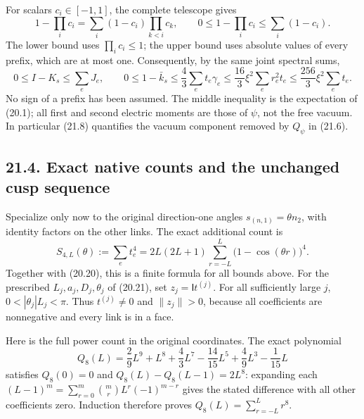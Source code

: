 \documentclass[
]{article}
\begin{document}
For scalars \(c_i\in[-1,1]\), the complete telescope gives \[
1-\prod_i c_i=\sum_i(1-c_i)\prod_{k<i}c_k,\qquad
0\le1-\prod_i c_i\le\sum_i(1-c_i).
\] The lower bound uses \(\prod_i c_i\le1\); the upper bound uses
absolute values of every prefix, which are at most one. Consequently, by
the same joint spectral sums, \[
0\le I-K_s\le\sum_e J_e,\qquad
0\le1-\bar k_s
 \le\frac43\sum_e t_e\gamma_e
 \le\frac{16}{3}\xi^2\sum_e r_e^2t_e
 \le\frac{256}{3}\xi^2\sum_e t_e .                             \tag{21.8}
\] No sign of a prefix has been assumed. The middle inequality is the
expectation of (20.1); all first and second electric moments are those
of \(\psi\), not the free vacuum. In particular (21.8) quantifies the
vacuum component removed by \(Q_\psi\) in (21.6).

\subsection{21.4. Exact native counts and the unchanged cusp
sequence}\label{exact-native-counts-and-the-unchanged-cusp-sequence}

Specialize only now to the original direction-one angles
\(s_{(n,1)}=\theta n_2\), with identity factors on the other links. The
exact additional count is \[
S_{4,L}(\theta):=\sum_e t_e^4
 =2L(2L+1)\sum_{r=-L}^{L}\bigl(1-\cos(\theta r)\bigr)^4 .
                                                               \tag{21.9}
\] Together with (20.20), this is a finite formula for all bounds above.
For the prescribed \(L_j,a_j,D_j,\theta_j\) of (20.21), set
\(z_j=\mathsf I t^{(j)}\). For all sufficiently large \(j\),
\(0<|\theta_j|L_j<\pi\). Thus \(t^{(j)}\ne0\) and \(\|z_j\|>0\), because
all coefficients are nonnegative and every link is in a face.

Here is the full power count in the original coordinates. The exact
polynomial \[
Q_8(L)=\frac29L^9+L^8+\frac43L^7
                   -\frac{14}{15}L^5+\frac49L^3-\frac1{15}L
\] satisfies \(Q_8(0)=0\) and \(Q_8(L)-Q_8(L-1)=2L^8\): expanding each
\((L-1)^m=\sum_{r=0}^m\binom mr L^r(-1)^{m-r}\) gives the stated
difference with all other coefficients zero. Induction therefore proves
\(Q_8(L)=\sum_{r=-L}^Lr^8\).
\end{document}
